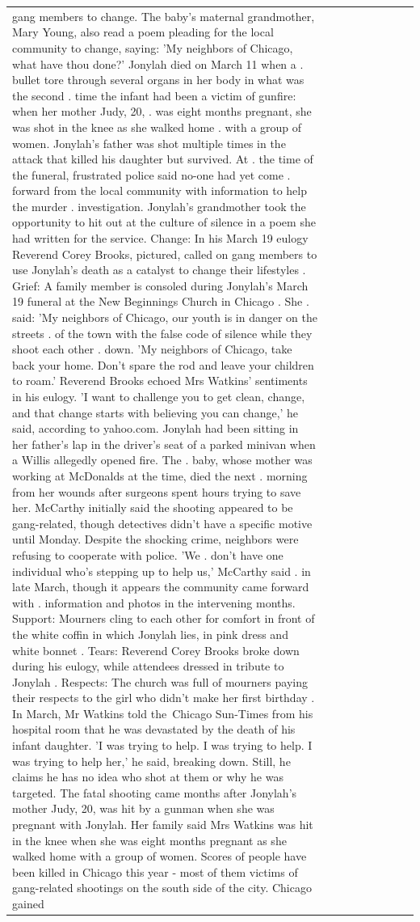 \begin{table}[H]
\begin{tabular}{lllrlllll}
gang members to change. The baby's maternal grandmother, Mary Young, also read a poem pleading for the local community to change, saying: 'My neighbors of Chicago, what have thou done?' Jonylah died on March 11 when a . bullet tore through several organs in her body in what was the second . time the infant had been a victim of gunfire: when her mother Judy, 20, . was eight months pregnant, she was shot in the knee as she walked home . with a group of women. Jonylah's father was shot multiple times in the attack that killed his daughter but survived. At . the time of the funeral, frustrated police said no-one had yet come . forward from the local community with information to help the murder . investigation. Jonylah's grandmother took the opportunity to hit out at the culture of silence in a poem she had written for the service. Change: In his March 19 eulogy Reverend Corey Brooks, pictured, called on gang members to use Jonylah's death as a catalyst to change their lifestyles . Grief: A family member is consoled during Jonylah's March 19 funeral at the New Beginnings Church in Chicago . She . said: 'My neighbors of Chicago, our youth is in danger on the streets . of the town with the false code of silence while they shoot each other . down. 'My neighbors of Chicago, take back your home. Don't spare the rod and leave your children to roam.' Reverend Brooks echoed Mrs Watkins' sentiments in his eulogy. 'I want to challenge you to get clean, change, and that change starts with believing you can change,' he said, according to yahoo.com. Jonylah had been sitting in her father's lap in the driver's seat of a parked minivan when a Willis allegedly opened fire. The . baby, whose mother was working at McDonalds at the time, died the next . morning from her wounds after surgeons spent hours trying to save her. McCarthy initially said the shooting appeared to be gang-related, though detectives didn't have a specific motive until Monday. Despite the shocking crime, neighbors were refusing to cooperate with police. 'We . don't have one individual who's stepping up to help us,' McCarthy said . in late March, though it appears the community came forward with . information and photos in the intervening months. Support: Mourners cling to each other for comfort in front of the white coffin in which Jonylah lies, in pink dress and white bonnet . Tears: Reverend Corey Brooks broke down during his eulogy, while attendees dressed in tribute to Jonylah . Respects: The church was full of mourners paying their respects to the girl who didn't make her first birthday . In March, Mr Watkins told the Chicago Sun-Times from his hospital room that he was devastated by the death of his infant daughter. 'I was trying to help. I was trying to help. I was trying to help her,' he said, breaking down. Still, he claims he has no idea who shot at them or why he was targeted. The fatal shooting came months after Jonylah's mother Judy, 20, was hit by a gunman when she was pregnant with Jonylah. Her family said Mrs Watkins was hit in the knee when she was eight months pregnant as she walked home with a group of women. Scores of people have been killed in Chicago this year - most of them victims of gang-related shootings on the south side of the city. Chicago gained 
\end{tabular}
\end{table}
